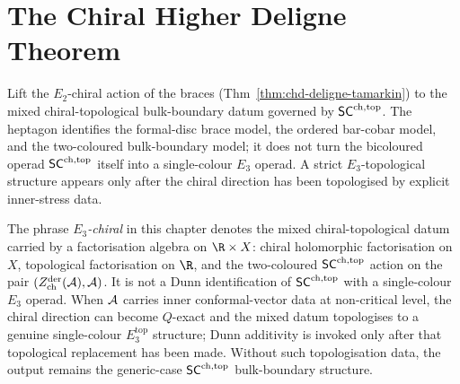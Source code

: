 \section{The Chiral Higher Deligne Theorem}
\label{sec:chd-main}

Lift the $E_2$-chiral action of the braces
(Thm~\ref{thm:chd-deligne-tamarkin}) to the mixed
chiral-topological bulk-boundary datum governed by $\mathsf{SC}^{\mathrm{ch},\mathrm{top}}$. The
heptagon identifies the formal-disc brace model, the ordered
bar-cobar model, and the two-coloured bulk-boundary model; it does not
turn the bicoloured operad $\mathsf{SC}^{\mathrm{ch},\mathrm{top}}$ itself into a single-colour
$E_3$ operad. A strict $E_3$-topological structure appears only after
the chiral direction has been topologised by explicit inner-stress
data.

\begin{convention}%
\label{conv:chd-e3-chiral-meaning}%
%
The phrase \emph{$E_3$-chiral} in this chapter denotes the mixed
chiral-topological datum carried by a factorisation algebra on
$\R\times X$: chiral holomorphic factorisation on $X$, topological
factorisation on $\R$, and the two-coloured $\mathsf{SC}^{\mathrm{ch},\mathrm{top}}$ action on the
pair $(Z^{\mathrm{der}}_{\mathrm{ch}}(\mathcal{A}),\mathcal{A})$. It is not a Dunn
identification of $\mathsf{SC}^{\mathrm{ch},\mathrm{top}}$ with a single-colour $E_3$ operad. When
$\mathcal{A}$ carries inner conformal-vector data at non-critical level, the
chiral direction can become $Q$-exact and the mixed datum topologises
to a genuine single-colour $E_3^{\mathrm{top}}$ structure; Dunn
additivity is invoked only after that topological replacement has been
made. Without such topologisation data, the output remains the
generic-case $\mathsf{SC}^{\mathrm{ch},\mathrm{top}}$ bulk-boundary structure.
\end{convention}

